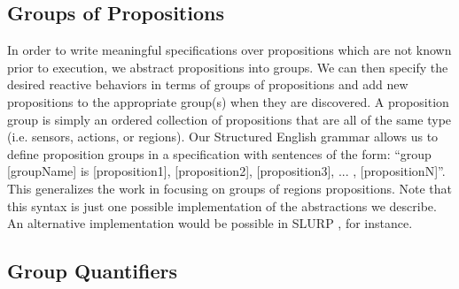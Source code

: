 \subsection{Groups of Propositions} 

In order to write meaningful specifications over propositions which are not known prior to execution, we abstract propositions into groups. We can then specify the desired reactive behaviors in terms of groups of propositions and add new propositions to the appropriate group(s) when they are discovered. A proposition group is simply an ordered collection of propositions that are all of the same type (i.e. sensors, actions, or regions). Our Structured English grammar allows us to define proposition groups in a specification with sentences of the form: ``group [groupName] is [proposition1], [proposition2], [proposition3], ... , [propositionN]''. This generalizes the work in \cite{BingxinIROS12} focusing on groups of regions propositions. Note that this syntax is just one possible implementation of the abstractions we describe. An alternative implementation would be possible in SLURP \cite{findTheSlurpPaper}, for instance. 

\subsection{Group Quantifiers} 

